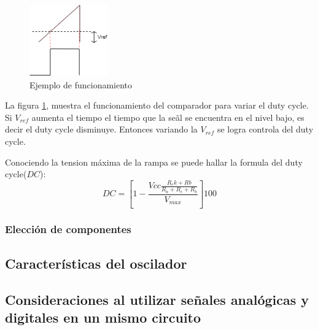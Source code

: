 \documentclass[../../ASSD_TP1_G7.tex]{subfiles}
\begin{document}
\begin{figure}[H]
\centering
\includegraphics[width=0.3\textwidth]{figures/r2sq.png}
\caption{Ejemplo de funcionamiento}\label{fig:ej}
\end{figure}

La figura \ref{fig:ej}, muestra el funcionamiento del comparador para variar el duty cycle. Si $V_{ref}$ aumenta el tiempo el tiempo que la se\~al se encuentra en el nivel bajo, es decir el duty cycle disminuye. Entonces variando la $V_{ref}$ se logra controla del duty cycle. 
\par Conociendo la tension máxima de la rampa se puede hallar la formula del duty cycle($DC$):
\begin{equation}
DC=\left[ 1 - \frac{Vcc \frac{R_ck + Rb}{R_a + R_c + R_b}}{V_{max}} \right] 100
\end{equation}

\subsubsection*{Elección de componentes}


\subsection*{Características del oscilador}
\subsection*{Consideraciones al utilizar se\~nales analógicas y digitales en un mismo circuito }
\end{document}

